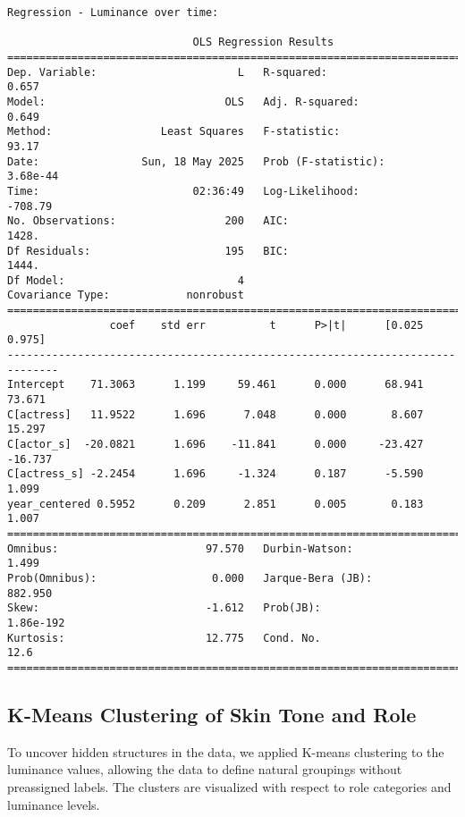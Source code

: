 \begin{lstlisting}
Regression - Luminance over time:

                             OLS Regression Results                            
==============================================================================
Dep. Variable:                      L   R-squared:                       0.657
Model:                            OLS   Adj. R-squared:                  0.649
Method:                 Least Squares   F-statistic:                     93.17
Date:                Sun, 18 May 2025   Prob (F-statistic):           3.68e-44
Time:                        02:36:49   Log-Likelihood:                -708.79
No. Observations:                 200   AIC:                             1428.
Df Residuals:                     195   BIC:                             1444.
Df Model:                           4                                         
Covariance Type:            nonrobust                                         
==============================================================================
                coef    std err          t      P>|t|      [0.025      0.975]
------------------------------------------------------------------------------
Intercept    71.3063      1.199     59.461      0.000      68.941      73.671
C[actress]   11.9522      1.696      7.048      0.000       8.607      15.297
C[actor_s]  -20.0821      1.696    -11.841      0.000     -23.427     -16.737
C[actress_s] -2.2454      1.696     -1.324      0.187      -5.590       1.099
year_centered 0.5952      0.209      2.851      0.005       0.183       1.007
==============================================================================
Omnibus:                       97.570   Durbin-Watson:                   1.499
Prob(Omnibus):                  0.000   Jarque-Bera (JB):              882.950
Skew:                          -1.612   Prob(JB):                    1.86e-192
Kurtosis:                      12.775   Cond. No.                         12.6
==============================================================================
\end{lstlisting}

\subsection{K-Means Clustering of Skin Tone and Role}
To uncover hidden structures in the data, we applied K-means clustering to the luminance values, allowing the data to define natural groupings without preassigned labels. The clusters are visualized with respect to role categories and luminance levels.


